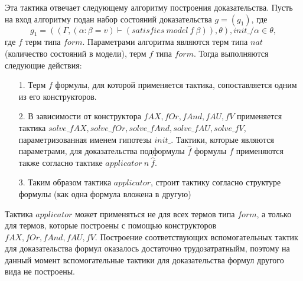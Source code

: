 \documentclass[12pt]{article}
\begin{document}
Эта тактика отвечает следующему алгоритму построения доказательства.
Пусть на вход алгоритму подан набор состояний доказательства $g = (g_1)$, где $$g_1 = ((\Gamma, (\alpha: \beta = v) \vdash (satisfies\ model\ f\ \beta)), \theta), init\_/\alpha \in \theta,$$ где $f$ терм типа $form$. 
Параметрами алгоритма являются терм типа $nat$ (количество состояний в модели), терм $f$ типа $form$.
Тогда выполняются следующие действия:
\begin{enumerate}
    \item[1.] Терм $f$ формулы, для которой применяется тактика, сопоставляется одним из его конструкторов.
    \item[2.] В зависимости от конструктора $fAX, fOr, fAnd, fAU, fV$ применяется тактика $solve\_fAX, solve\_fOr, solve\_fAnd, solve\_fAU, solve\_fV$, параметризованная именем гипотезы $init\_$. Тактики, которые являются параметрами, для доказательства подформулы $\hat{f}$ формулы $f$ применяются также согласно тактике $applicator\ n\ \hat{f}$.



    
    \item[3.] Таким образом тактика $applicator$, строит тактику согласно структуре формулы (как одна формула вложена в другую)
\end{enumerate}

Тактика $applicator$ может применяться не для всех термов типа $form$, а только для термов, которые построены с помощью конструкторов $fAX, fOr, fAnd, fAU, fV$. Построение соответствующих вспомогательных тактик для доказательства формул оказалось достаточно трудозатратныйм, поэтому на данный момент вспомогательные тактики для доказательства формул другого вида не построены.
\end{document}
